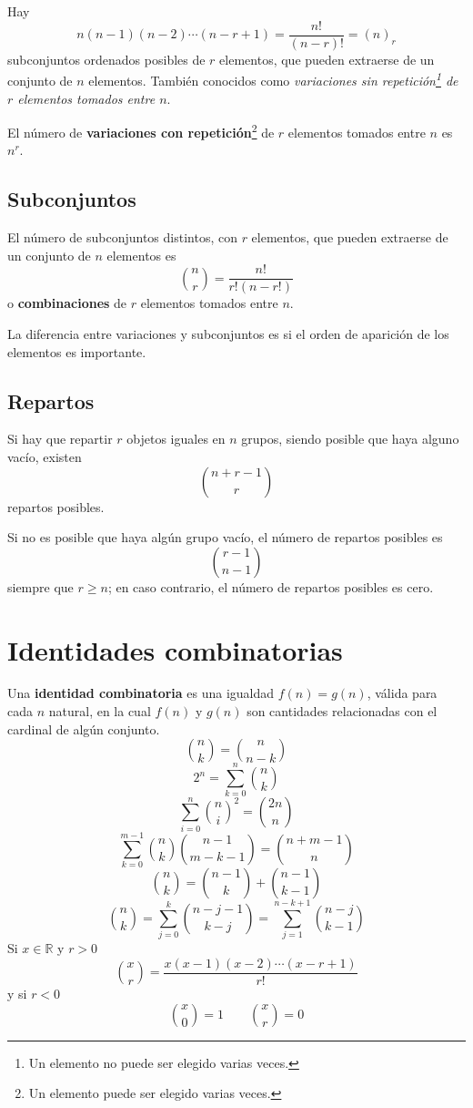 Hay \[n(n-1)(n-2)\cdots(n-r+1) = \frac{n!}{(n-r)!} = (n)_r\] subconjuntos ordenados posibles de \(r\) elementos, que pueden extraerse de un conjunto de \(n\) elementos. También conocidos como \emph{variaciones sin repetición\footnote{Un elemento no puede ser elegido varias veces.} de \(r\) elementos tomados entre \(n\)}.

El número de \textbf{variaciones con repetición}\footnote{Un elemento puede ser elegido varias veces.} de \(r\) elementos tomados entre \(n\) es \(n^r\). 

\subsection{Subconjuntos} 

El número de subconjuntos distintos, con \(r\) elementos, que pueden extraerse de un conjunto de \(n\) elementos es 
\[
\binom{n}{r}=\frac{n!}{r!(n-r!)}
\] 
o \textbf{combinaciones} de \(r\) elementos tomados entre \(n\).

La diferencia entre variaciones y subconjuntos es si el orden de aparición de los elementos es importante. 

\subsection{Repartos} 

Si hay que repartir \(r\) objetos iguales en \(n\) grupos, siendo posible que haya alguno vacío, existen 
\[
\binom{n+r-1}{r}
\] 
repartos posibles. 

Si no es posible que haya algún grupo vacío, el número de repartos posibles es
\[\binom{r-1}{n-1}\] 
siempre que \(r \geq n\); en caso contrario, el número de repartos posibles es cero.

\section{Identidades combinatorias}

Una \textbf{identidad combinatoria} es una igualdad \(f(n)=g(n)\), válida para cada \(n\) natural, en la cual \(f(n)\) y \(g(n)\) son
cantidades relacionadas con el cardinal de algún conjunto. 
\[\binom{n}{k}=\binom{n}{n-k}\] \[2^n=\sum_{k=0}^n \binom{n}{k}\] \[
  \sum_{i=0}^n \binom{n}{i}^2 = \binom{2n}{n}
\] \[
  \sum_{k=0}^{m-1} \binom{n}{k}\binom{n-1}{m-k-1}=\binom{n+m-1}{n}
\] \[
  \binom{n}{k}=\binom{n-1}{k}+\binom{n-1}{k-1}
\] \[
  \binom{n}{k}=\sum_{j=0}^{k}\binom{n-j-1}{k-j}=\sum_{j=1}^{n-k+1}\binom{n-j}{k-1}
\] Si \(x \in \mathbb{R}\) y \(r >0\) \[
  \binom{x}{r} = \frac{x(x-1)(x-2)\cdots(x-r+1)}{r!}
\] y si \(r < 0\) \[
  \binom{x}{0} = 1 \qquad \binom{x}{r} = 0
\] 

